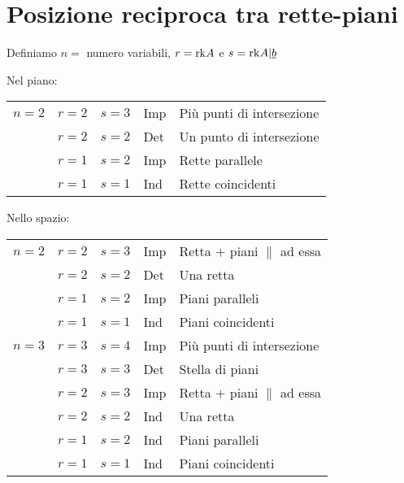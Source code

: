 \section{Posizione reciproca tra rette-piani}
Definiamo $n = $ numero variabili, $r = \mathrm{rk} A$ e $s = \mathrm{rk} A|\underline{b}$

Nel piano:
\begin{tabular}{@{}lllll@{}}
	$n = 2$ & $r = 2$ & $s = 3$ & Imp & Più punti di intersezione \\
	        & $r = 2$ & $s = 2$ & Det & Un punto di intersezione \\
	        & $r = 1$ & $s = 2$ & Imp & Rette parallele \\
	        & $r = 1$ & $s = 1$ & Ind & Rette coincidenti \\
\end{tabular}
Nello spazio:
\begin{tabular}{@{}lllll@{}}
	$n = 2$ & $r = 2$ & $s = 3$ & Imp & Retta + piani $\parallel$ ad essa \\
			& $r = 2$ & $s = 2$ & Det & Una retta \\
			& $r = 1$ & $s = 2$ & Imp & Piani paralleli \\
			& $r = 1$ & $s = 1$ & Ind & Piani coincidenti \\
	$n = 3$ & $r = 3$ & $s = 4$ & Imp & Più punti di intersezione \\
			& $r = 3$ & $s = 3$ & Det & Stella di piani \\
			& $r = 2$ & $s = 3$ & Imp & Retta + piani $\parallel$ ad essa \\
			& $r = 2$ & $s = 2$ & Ind & Una retta \\
			& $r = 1$ & $s = 2$ & Ind & Piani paralleli \\
			& $r = 1$ & $s = 1$ & Ind & Piani coincidenti \\
\end{tabular}

